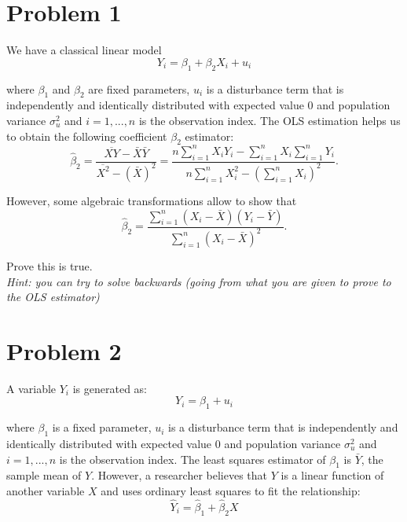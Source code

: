 \documentclass[12pt,letterpaper]{article}
\begin{document}
\section*{Problem 1}

We have a classical linear model 
\begin{equation*}
    Y_i = \beta_1 + \beta_2 X_i + u_i
\end{equation*}

where $\beta_1$ and $\beta_2$ are fixed parameters, $u_i$ is a disturbance term that is independently and identically distributed with expected value 0 and population variance $\sigma_u^2$ and $i = {1, ..., n}$ is the observation index. The OLS estimation helps us to obtain the following coefficient $\beta_2$ estimator: 
\begin{equation*}
    \hat\beta_2 = \frac{\overline {XY} - \bar {X} \bar Y}
    {\overline {X^2} - (\bar X)^2} = 
    \frac{n \sum \limits_{i=1}^n X_i Y_i - \sum \limits_{i=1}^n X_i \sum \limits_{i=1}^n Y_i}
    {n \sum \limits_{i=1}^n X_i^2 - (\sum \limits_{i=1}^n X_i)^2}.
\end{equation*}

However, some algebraic transformations allow to show that 
\begin{equation*}
    \hat\beta_2 = \frac{\sum \limits_{i=1}^n (X_i - \bar X)(Y_i - \bar Y)}
    {\sum \limits_{i=1}^n (X_i - \bar X)^2}.
\end{equation*}

Prove this is true. \\
{\itshape Hint: you can try to solve backwards (going from what you are given to prove to the OLS estimator)}


\section*{Problem 2}
A variable $Y_i$ is generated as: 
\begin{equation*}
    Y_i = \beta_1 + u_i
\end{equation*}

where $\beta_1$ is a fixed parameter, $u_i$ is a disturbance term that is independently and identically distributed with expected value 0 and population variance $\sigma_u^2$ and $i = {1, ..., n}$ is the observation index. The least squares estimator of $\beta_1$ is $\bar Y$, the sample mean of $Y$. However, a researcher believes that $Y$ is a linear function of another variable $X$ and uses ordinary least squares to fit the relationship:
\begin{equation*}
    \hat Y_i = \hat \beta_1 + \hat \beta_2 X
\end{equation*}
\end{document}
